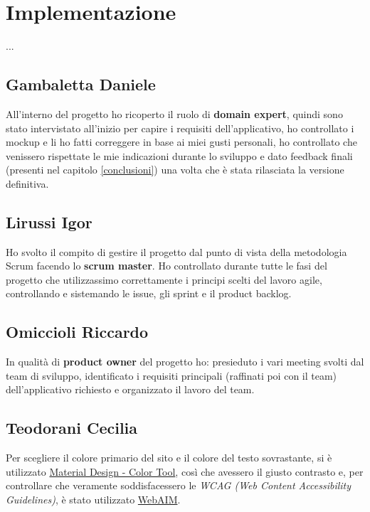 
\chapter{Implementazione}
...
    \section{Gambaletta Daniele}
    All'interno del progetto ho ricoperto il ruolo di \textbf{domain expert}, quindi sono stato intervistato all'inizio per capire i requisiti dell'applicativo, ho controllato i mockup e li ho fatti correggere in base ai miei gusti personali, ho controllato che venissero rispettate le mie indicazioni durante lo sviluppo e dato feedback finali (presenti nel capitolo \ref{conclusioni}) una volta che è stata rilasciata la versione definitiva.
    
    \section{Lirussi Igor}
    Ho svolto il compito di gestire il progetto dal punto di vista della metodologia Scrum facendo lo \textbf{scrum master}. Ho controllato durante tutte le fasi del progetto che utilizzassimo correttamente i principi scelti del lavoro agile, controllando e sistemando le issue, gli sprint e il product backlog.
    
    \section{Omiccioli Riccardo}
   In qualità di \textbf{product owner} del progetto ho: presieduto i vari meeting svolti dal team di sviluppo, identificato i requisiti principali (raffinati poi con il team) dell'applicativo richiesto e organizzato il lavoro del team.
    
    \section{Teodorani Cecilia}

    Per scegliere il colore primario del sito e il colore del testo sovrastante, si è utilizzato \href{https://m2.material.io/resources/color/#!/?view.left=1&view.right=1&primary.color=8a171a&secondary.color=DEDEDE}{Material Design - Color Tool}, così che avessero il giusto contrasto e, per controllare che veramente soddisfacessero le \textit{WCAG (Web Content Accessibility Guidelines)}, è stato utilizzato \href{https://webaim.org/resources/contrastchecker/?fcolor=DEDEDE&bcolor=8A171A}{WebAIM}.